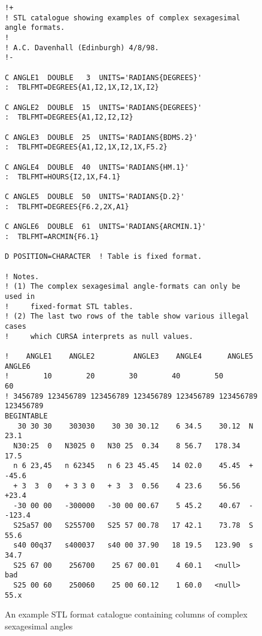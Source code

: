 \documentclass[twoside,11pt]{article}
\renewcommand{\_}{\texttt{\symbol{95}}}
\begin{document}
\begin{figure}[htbp]


\begin{verbatim}
!+
! STL catalogue showing examples of complex sexagesimal angle formats.
!
! A.C. Davenhall (Edinburgh) 4/8/98.
!-

C ANGLE1  DOUBLE   3  UNITS='RADIANS{DEGREES}'
:  TBLFMT=DEGREES{A1,I2,1X,I2,1X,I2}

C ANGLE2  DOUBLE  15  UNITS='RADIANS{DEGREES}'
:  TBLFMT=DEGREES{A1,I2,I2,I2}

C ANGLE3  DOUBLE  25  UNITS='RADIANS{BDMS.2}'
:  TBLFMT=DEGREES{A1,I2,1X,I2,1X,F5.2}

C ANGLE4  DOUBLE  40  UNITS='RADIANS{HM.1}'
:  TBLFMT=HOURS{I2,1X,F4.1}

C ANGLE5  DOUBLE  50  UNITS='RADIANS{D.2}'
:  TBLFMT=DEGREES{F6.2,2X,A1}

C ANGLE6  DOUBLE  61  UNITS='RADIANS{ARCMIN.1}'
:  TBLFMT=ARCMIN{F6.1}

D POSITION=CHARACTER  ! Table is fixed format.

! Notes.
! (1) The complex sexagesimal angle-formats can only be used in
!     fixed-format STL tables.
! (2) The last two rows of the table show various illegal cases
!     which CURSA interprets as null values.

!    ANGLE1    ANGLE2         ANGLE3    ANGLE4      ANGLE5  ANGLE6
!        10        20        30        40        50        60
! 3456789 123456789 123456789 123456789 123456789 123456789 123456789
BEGINTABLE
   30 30 30    303030    30 30 30.12    6 34.5    30.12  N    23.1
  N30:25  0   N3025 0   N30 25  0.34    8 56.7   178.34       17.5
  n 6 23,45   n 62345   n 6 23 45.45   14 02.0    45.45  +   -45.6
  + 3  3  0   + 3 3 0   + 3  3  0.56    4 23.6    56.56      +23.4
  -30 00 00   -300000   -30 00 00.67    5 45.2    40.67  -  -123.4
  S25a57 00   S255700   S25 57 00.78   17 42.1    73.78  S    55.6
  s40 00q37   s400037   s40 00 37.90   18 19.5   123.90  s    34.7
  S25 67 00    256700    25 67 00.01    4 60.1   <null>        bad
  S25 00 60    250060    25 00 60.12    1 60.0   <null>       55.x
\end{verbatim}

\begin{quote}
\caption[Example STL format catalogue with complex sexagesimal angles]
{An example STL format catalogue containing columns of complex sexagesimal
angles\label{STLCOMPANG} }
\end{quote}

\end{figure}
\end{document}
